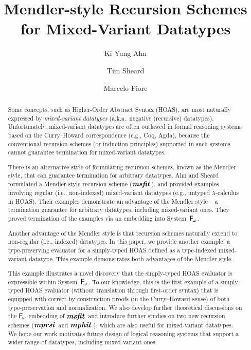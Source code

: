 \documentclass[a4paper,UKenglish]{lipics}
\title{Mendler-style Recursion Schemes for Mixed-Variant Datatypes
	}
\author[1]{Ki Yung Ahn}
\author[1]{Tim Sheard}
\author[2]{Marcelo Fiore}
\affil[1]{Department of Computer Science, Portland State University\\
  Oregon, USA\\
  \texttt{\{kya,sheard\}@cs.pdx.edu}}
\affil[2]{Computer Laboratory, University of Cambridge\\
  Cambridge, UK\\
  \texttt{Marcelo.Fiore@cl.cam.ac.uk}}
\newcommand{\eg}[0]{{e.g.}}
\newcommand{\ie}[0]{{i.e.}}
\newcommand{\aka}[0]{{a.k.a.}}
\newcommand{\Fw}[0]{{\ensuremath{\mathsf{\uppercase{F}}_{\!\omega}}}}
\newcommand{\msfit}[1]{\ensuremath{\textbf{\textit{msfit}}_{#1}}}
\newcommand{\mprsi}[1]{\ensuremath{\textbf{\textit{mprsi}}_{#1}}}
\newcommand{\mphit}[1]{\ensuremath{\textbf{\textit{mphit}}_{#1}\,}}
\begin{document}
\maketitle

\begin{abstract}
Some concepts, such as Higher-Order Abstract Syntax (HOAS),
are most naturally expressed by \emph{mixed-variant datatypes}
(\aka\ negative (recursive) datatypes). Unfortunately,
mixed-variant datatypes are often outlawed in formal reasoning systems
based on the Curry--Howard correspondence (\eg, Coq, Agda), because
the conventional recursion schemes (or induction principles) supported in
such systems cannot guarantee termination for mixed-variant datatypes.

There is an alternative style of formulating recursion schemes,
known as the Mendler style, that can guarantee termination for
arbitrary datatypes. Ahn and Sheard \cite{AhnShe11} formulated
a Mendler-style recursion scheme (\msfit{}), and provided
examples involving regular (\ie, non-indexed) mixed-variant datatypes
(\eg, untyped $\lambda$-calculus in HOAS). Their examples demonstrate
an advantage of the Mendler style -- a termination guarantee for
arbitrary datatypes, including mixed-variant ones. They proved
termination of the examples via an embedding into System~\Fw.

Another advantage of the Mendler style is that recursion schemes
naturally extend to non-regular (\ie, indexed) datatypes. In this paper,
we provide another example: a type-preserving evaluator for a simply-typed HOAS
defined as a type-indexed mixed-variant datatype. This example demonstrates
both advantages of the Mendler style.

This example illustrates a novel discovery that the simply-typed HOAS evaluator
is expressible within System~\Fw. To our knowledge, this is the first example of
a simply-typed HOAS evaluator (without translation through first-order syntax)
that is equipped with correct-by-construction proofs (in the Curry--Howard
sense) of both type-preservation and normalization. We also develop further
theoretical discussions on the \Fw-embedding of \msfit{}
and introduce further studies on two new recursion schemes
(\mprsi{} and \mphit{}), which are also useful for mixed-variant datatypes.
We hope our work motivates future design of
logical reasoning systems that support a wider range of datatypes,
including mixed-variant ones.
\end{abstract}









\end{document}
